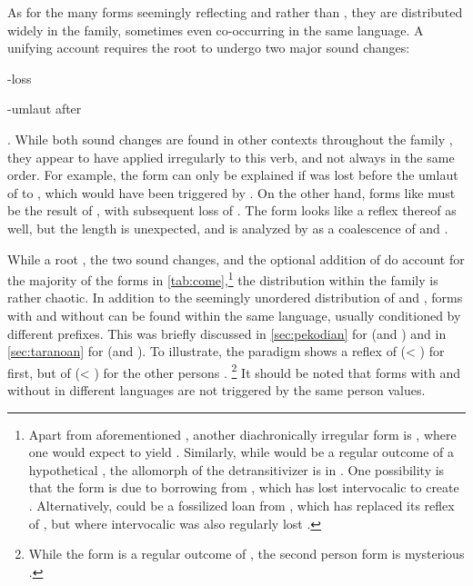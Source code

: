 As for the many forms seemingly reflecting  and  rather than , they are distributed widely in the family, sometimes even co-occurring in the same language.
A unifying account requires the root  to undergo two major sound changes: \begin{inlinelist}
 \item {}-loss
 \item {}-umlaut after 
 \end{inlinelist}.
While both sound changes are found in other contexts throughout the family \parencite{meira2010origin}, they appear to have applied irregularly to this verb, and not always in the same order.
For example, the \kalina form  can only be explained if  was lost before the umlaut of  to , which would have been triggered by .
On the other hand, forms like \maqui {} must be the result of , with subsequent loss of .
The \akuriyo form  looks like a reflex thereof as well, but the length is unexpected, and is analyzed by \textcite[]{meira1998proto} as a coalescence of  and .


While a root , the two sound changes, and the optional addition of  do account for the majority of the forms in \cref{tab:come},\footnote{
	Apart from aforementioned \akuriyo {}, another diachronically irregular form is \apalai {}, where one would expect  to yield  \parencite[506]{meira2010origin}.
	Similarly, while  would be a regular outcome of a hypothetical , the  allomorph of the detransitivizer is  in \apalai.
	One possibility is that the form is due to borrowing from \trio, which has lost intervocalic  to create .
	Alternatively, \apalai {} could be a fossilized loan from \wayana, which has replaced its reflex of , but where intervocalic  was also regularly lost \parencite[63]{wayanatavares2005}.}
the distribution within the family is rather chaotic.
In addition to the seemingly unordered distribution of  and , forms with and without  can be found within the same language, usually conditioned by different prefixes.
This was briefly discussed in \cref{sec:pekodian} for \arara (and \PPek) and in \cref{sec:taranoan} for \trio (and \PTar).
To illustrate, the \trio \setone paradigm shows a reflex of  (< ) for first, but of  (< ) for the other persons .%
\footnote{While the  form is a regular outcome of , the second person form is mysterious \parencite[115]{meira1998proto}.}
It should be noted that forms with and without  in different languages are not triggered by the same person values.


